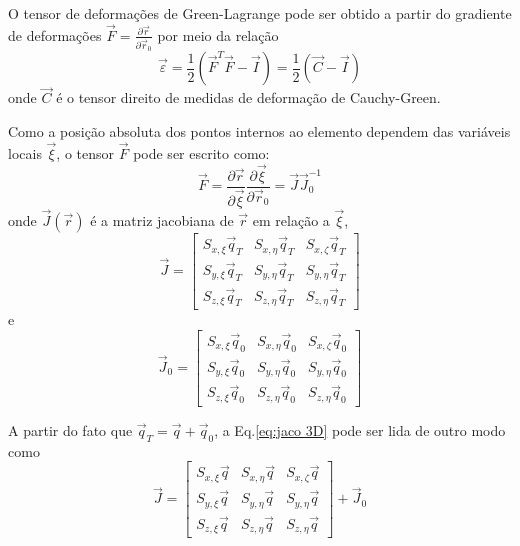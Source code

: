 O tensor de deformações de Green-Lagrange pode ser obtido a partir do gradiente de 
deformações $\vec{F} = \frac{\partial \vec{r}}{\partial \vec{r}_0}$ por meio da relação
\begin{equation}
    \vec{\varepsilon} = \frac{1}{2}\left(\vec{F}^T\vec{F} - \vec{I}\right) = \frac{1}{2}\left(\vec{C} - \vec{I}\right)
    \label{eq: tensor def Lagrange}
\end{equation}
onde $\vec{C}$ é o tensor direito de medidas de deformação de Cauchy-Green.

Como a posição absoluta dos pontos internos ao elemento dependem das variáveis locais $\vec{\xi}$,
o tensor $\vec{F}$ pode ser escrito como:
\begin{equation}
    \vec{F} = \frac{\partial \vec{r}}{\partial \vec{\xi}} \frac{\partial \vec{\xi}}{\partial \vec{r}_0} = \vec{J}\vec{J}_0^{-1}
\end{equation}
onde $\vec{J}(\vec{r})$ é a matriz jacobiana de $\vec{r}$ em relação a $\vec{\xi}$,
\begin{equation} \vec{J} = \begin{bmatrix} 
        S_{x,\xi}\vec{q}_T & S_{x,\eta}\vec{q}_T & S_{x,\zeta}\vec{q}_T \\
        S_{y,\xi}\vec{q}_T & S_{y,\eta}\vec{q}_T & S_{y,\eta}\vec{q}_T \\
        S_{z,\xi}\vec{q}_T & S_{z,\eta}\vec{q}_T & S_{z,\eta}\vec{q}_T
\end{bmatrix}  \label{eq:jaco 3D} \end{equation}
e 
\begin{equation} \vec{J}_0 = \begin{bmatrix} 
        S_{x,\xi}\vec{q}_0 & S_{x,\eta}\vec{q}_0 & S_{x,\zeta}\vec{q}_0 \\
        S_{y,\xi}\vec{q}_0 & S_{y,\eta}\vec{q}_0 & S_{y,\eta}\vec{q}_0 \\
        S_{z,\xi}\vec{q}_0 & S_{z,\eta}\vec{q}_0 & S_{z,\eta}\vec{q}_0
\end{bmatrix}  \label{eq:jaco0 3D} \end{equation}

A partir do fato que $\vec{q}_T = \vec{q} + \vec{q}_0$, a Eq.\eqref{eq:jaco 3D} pode ser lida de outro modo como
\begin{equation} \vec{J} = \begin{bmatrix} 
        S_{x,\xi}\vec{q} & S_{x,\eta}\vec{q} & S_{x,\zeta}\vec{q} \\
        S_{y,\xi}\vec{q} & S_{y,\eta}\vec{q} & S_{y,\eta}\vec{q} \\
        S_{z,\xi}\vec{q} & S_{z,\eta}\vec{q} & S_{z,\eta}\vec{q}
\end{bmatrix} + \vec{J}_0 \label{eq:jaco 3D 2} \end{equation}

